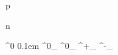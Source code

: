 

\newmathsymbol{\proton}     {p\xspace}
\newmathsymbol{\protonbar}  {\ovE{\proton}\xspace}
\newmathsymbol{\pp}         {\proton\proton\xspace}
\newmathsymbol{\ppbar}      {\proton\protonbar\xspace}

\newmathsymbol{\neutron}    {n\xspace}
\newmathsymbol{\neutronbar} {\ovE{\neutron}\xspace}

\newmathsymbol{\Lambdaz}    {\Lambda^0\xspace}
\newmathsymbol{\Lambdazbar} {\ovE{\Lambdaz}\xspace}
\newmathsymbol{\Lambdabar}  {\kern 0.1em\ovE{\kern -0.1em\Lambda}{}\xspace}
\newmathsymbol{\Lambdab}    {\Lambda^0_\bquark\xspace}
\newmathsymbol{\Lambdabbar} {\Lambdabar^0_\bquark\xspace}
\newmathsymbol{\Lambdac}    {\Lambda^+_\cquark\xspace}
\newmathsymbol{\Lambdacbar} {\Lambdabar^-_\cquark\xspace}


